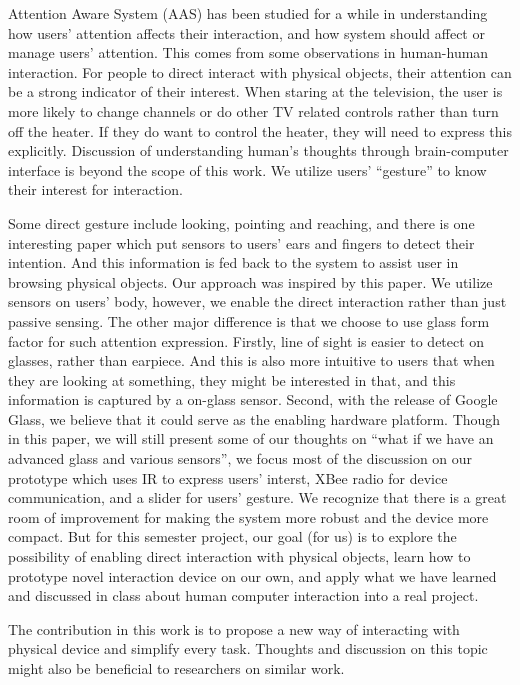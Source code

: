 Attention Aware System (AAS) \cite{horvitz2003models} has been studied for a while in understanding how users' attention affects their interaction, and how system should affect or manage users' attention. This comes from some observations in human-human interaction. For people to direct interact with physical objects, their attention can be a strong indicator of their interest. When staring at the television, the user is more likely to change channels or do other TV related controls rather than turn off the heater. If they do want to control the heater, they will need to express this explicitly. Discussion of understanding human's thoughts through brain-computer interface is beyond the scope of this work. We utilize users' ``gesture'' to know their interest for interaction.

Some direct gesture include looking, pointing and reaching, and there is one interesting paper \cite{Merrill:2007:ALP:1758156.1758158} which put sensors to users' ears and fingers to detect their intention. And this information is fed back to the system to assist user in browsing physical objects. Our approach was inspired by this paper. We utilize sensors on users' body, however, we enable the direct interaction rather than just passive sensing. The other major difference is that we choose to use glass form factor for such attention expression. Firstly, line of sight is easier to detect on glasses, rather than earpiece. And this is also more intuitive to users that when they are looking at something, they might be interested in that, and this information is captured by a on-glass sensor. Second, with the release of Google Glass, we believe that it could serve as the enabling hardware platform. Though in this paper, we will still present some of our thoughts on ``what if we have an advanced glass and various sensors'', we focus most of the discussion on our prototype which uses IR to express users' interst, XBee radio for device communication, and a slider for users' gesture. We recognize that there is a great room of improvement for making the system more robust and the device more compact. But for this semester project, our goal (for us) is to explore the possibility of enabling direct interaction with physical objects, learn how to prototype novel interaction device on our own, and apply what we have learned and discussed in class about human computer interaction into a real project.

The contribution in this work is to propose a new way of interacting with physical device and simplify every task. Thoughts and discussion on this topic might also be beneficial to researchers on similar work.

